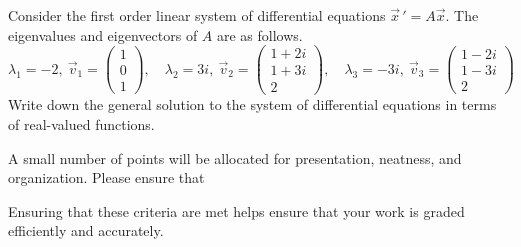 \documentclass[12pt]{exam}
\begin{document}
\begin{questions}
\newpage 

\question[5] Consider the first order linear system of differential equations $\vec x \, ' = A\vec x$. The eigenvalues and eigenvectors of $A$ are as follows. $$\lambda_1 = -2, \ \vec v_1 = \begin{pmatrix}1\\0\\1 \end{pmatrix} , \quad \lambda_2 = 3i, \ \vec v_2 = \begin{pmatrix} 1+2i\\1+3i\\2 \end{pmatrix}, \quad \lambda_3 = -3i, \ \vec v_3 = \begin{pmatrix} 1-2i\\1-3i\\2\end{pmatrix}$$
Write down the general solution to the system of differential equations in terms of real-valued functions. 

\newpage



\question[1] A small number of points will be allocated for presentation, neatness, and organization. Please ensure that
    Ensuring that these criteria are met helps ensure that your work is graded efficiently and accurately. 

\end{questions}
\vspace{2cm}
    
\end{document}
